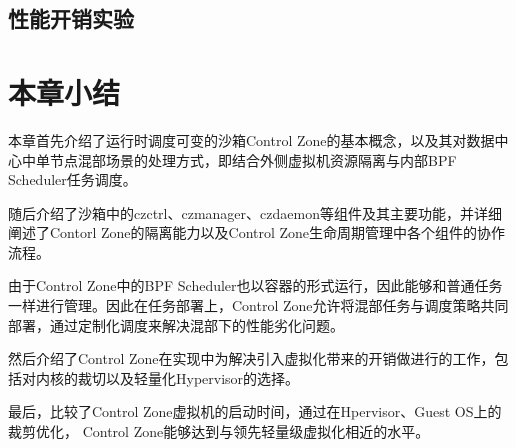 \subsection{性能开销实验}




\section{本章小结}

本章首先介绍了运行时调度可变的沙箱Control Zone的基本概念，以及其对数据中心中单节点混部场景的处理方式，即结合外侧虚拟机资源隔离与内部BPF Scheduler任务调度。

随后介绍了沙箱中的czctrl、czmanager、czdaemon等组件及其主要功能，并详细阐述了Contorl Zone的隔离能力以及Control Zone生命周期管理中各个组件的协作流程。

由于Control Zone中的BPF Scheduler也以容器的形式运行，因此能够和普通任务一样进行管理。因此在任务部署上，Control Zone允许将混部任务与调度策略共同部署，通过定制化调度来解决混部下的性能劣化问题。

然后介绍了Control Zone在实现中为解决引入虚拟化带来的开销做进行的工作，包括对内核的裁切以及轻量化Hypervisor的选择。

最后，比较了Control Zone虚拟机的启动时间，通过在Hpervisor、Guest OS上的裁剪优化， Control Zone能够达到与领先轻量级虚拟化相近的水平。